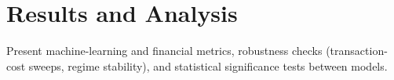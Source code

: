 \chapter{Results and Analysis}

Present machine-learning and financial metrics, robustness checks (transaction-cost sweeps, regime stability), and statistical significance tests between models.
